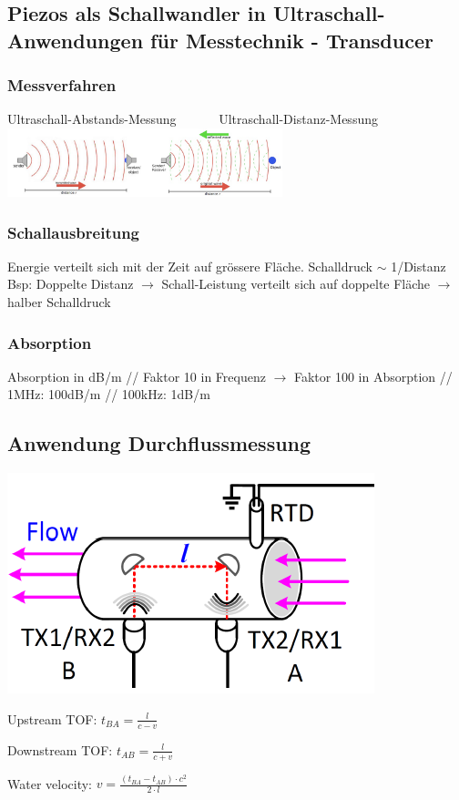 \subsection{Piezos als Schallwandler in
Ultraschall-Anwendungen für
Messtechnik - Transducer}
\subsubsection{Messverfahren}
Ultraschall-Abstands-Messung  \ \ \ \ \ \ Ultraschall-Distanz-Messung\\
\includegraphics[width=0.6\textwidth]{images/Messverfahren}
\subsubsection{Schallausbreitung}
Energie verteilt sich mit der Zeit auf grössere Fläche. Schalldruck $\sim$ 1/Distanz\\ Bsp: Doppelte Distanz $\rightarrow$ Schall-Leistung verteilt sich auf doppelte Fläche $\rightarrow$ halber Schalldruck
\subsubsection{Absorption}
Absorption in dB/m // Faktor 10 in Frequenz $\rightarrow$ Faktor 100 in Absorption // 1MHz: 100dB/m // 100kHz: 1dB/m

\subsection{Anwendung Durchflussmessung}
\begin{minipage}{0.3\textwidth}
    \includegraphics[width=0.8\textwidth]{images/AnwendungDurchflussmessung}   
\end{minipage}
\hfill
\begin{minipage}{0.65\textwidth}
    \begin{compactitem}
        \item Upstream TOF: $t_{BA} = \frac{l}{c-v}$
        \item Downstream TOF: $t_{AB} = \frac{l}{c+v}$
        \item Water velocity: $v = \frac{(t_{BA}-t_{AB})\cdot c^2}{2 \cdot l}$
    \end{compactitem}
\end{minipage}

